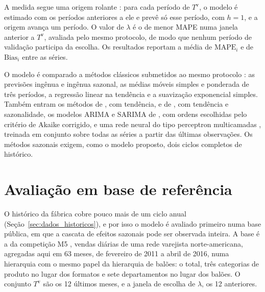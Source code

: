 \documentclass[
    12pt,
    openright,
    oneside,
    a4paper,
    fleqn,
    chapter=TITLE,
    section=TITLE,
    english,
    brazil
]{abntex2}
\begin{document}
A medida segue uma origem rolante \cite{tashman2000}: para cada período de $T^{\mathrm{v}}$, o modelo é estimado com os períodos anteriores a ele e prevê só esse período, com $h = 1$, e a origem avança um período. O valor de $\lambda$ é o de menor MAPE numa janela anterior a $T^{\mathrm{v}}$, avaliada pelo mesmo protocolo, de modo que nenhum período de validação participa da escolha. Os resultados reportam a média de $\mathrm{MAPE}_{i}$ e de $\mathrm{Bias}_{i}$ entre as séries.

O modelo é comparado a métodos clássicos submetidos ao mesmo protocolo \cite{hyndman2021}: as previsões ingênua e ingênua sazonal, as médias móveis simples e ponderada de três períodos, a regressão linear na tendência e a suavização exponencial simples. Também entram os métodos de , com tendência, e de , com tendência e sazonalidade, os modelos ARIMA e SARIMA de , com ordens escolhidas pelo critério de Akaike corrigido, e uma rede neural do tipo perceptron multicamadas \cite{zhang1998}, treinada em conjunto sobre todas as séries a partir das últimas observações. Os métodos sazonais exigem, como o modelo proposto, dois ciclos completos de histórico.

\section{Avaliação em base de referência}
\label{sec:previsao_referencia}

O histórico da fábrica cobre pouco mais de um ciclo anual (Seção~\ref{sec:dados_historicos}), e por isso o modelo é avaliado primeiro numa base pública, em que a cascata de efeitos sazonais pode ser observada inteira. A base é a da competição M5 \cite{makridakis2022}, vendas diárias de uma rede varejista norte-americana, agregadas aqui em 63 meses, de fevereiro de 2011 a abril de 2016, numa hierarquia com o mesmo papel da hierarquia de balões: o total, três categorias de produto no lugar dos formatos e sete departamentos no lugar dos balões. O conjunto $T^{\mathrm{v}}$ são os 12 últimos meses, e a janela de escolha de $\lambda$, os 12 anteriores.

\begin{table}[H]
\centering
\small
\caption{Erro da previsão por departamento na base M5, de maio de 2015 a abril de 2016, com o modelo proposto em negrito.}
\label{tab:previsao_referencia}

\end{table}
\end{document}
